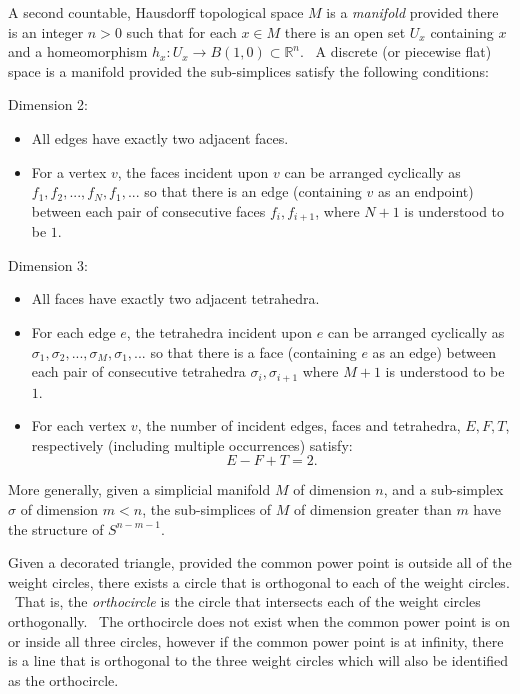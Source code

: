 \begin{description}
\item[manifold] A second countable, Hausdorff topological space $M$ is a 
\textit{manifold} provided there is an integer $n>0$ such that for each $%
x\in M$ there is an open set $U_{x}$ containing $x$ and a homeomorphism $%
h_{x}:U_{x}\rightarrow B\left( 1,0\right) \subset 
\mathbb{R}
^{n}$. \ A discrete (or piecewise flat) space is a manifold provided the
sub-simplices satisfy the following conditions:

\item Dimension 2:

\begin{itemize}
\item All edges have exactly two adjacent faces.

\item For a vertex $v$, the faces incident upon $v$ can be arranged
cyclically as $f_{1},f_{2},...,f_{N},f_{1},...$ so that there is an edge
(containing $v$ as an endpoint) between each pair of consecutive faces $%
f_{i},f_{i+1}$, where $N+1$ is understood to be $1$. \ 
\end{itemize}

\item Dimension 3:

\begin{itemize}
\item All faces have exactly two adjacent tetrahedra.

\item For each edge $e$, the tetrahedra incident upon $e$ can be arranged
cyclically as $\sigma _{1},\sigma _{2},...,\sigma _{M},\sigma _{1},...$ so
that there is a face (containing $e$ as an edge) between each pair of
consecutive tetrahedra $\sigma _{i},\sigma _{i+1}$ where $M+1$ is understood
to be $1$. \ 

\item For each vertex $v$, the number of incident edges, faces and
tetrahedra, $E,F,T$, respectively (including multiple occurrences) satisfy:%
\[
E-F+T=2.
\]
\end{itemize}

\item More generally, given a simplicial manifold $M$ of dimension $n$, and
a sub-simplex $\sigma $ of dimension $m<n$, the sub-simplices of $M$ of
dimension greater than $m$ have the structure of $S^{n-m-1}$.

\item[orthocircle] Given a decorated triangle, provided the common power
point is outside all of the weight circles, there exists a circle that is
orthogonal to each of the weight circles. \ That is, the \textit{orthocircle}
is the circle that intersects each of the weight circles orthogonally. \ The
orthocircle does not exist when the common power point is on or inside all
three circles, however if the common power point is at infinity, there is a
line that is orthogonal to the three weight circles which will also be
identified as the orthocircle.


\end{description}
